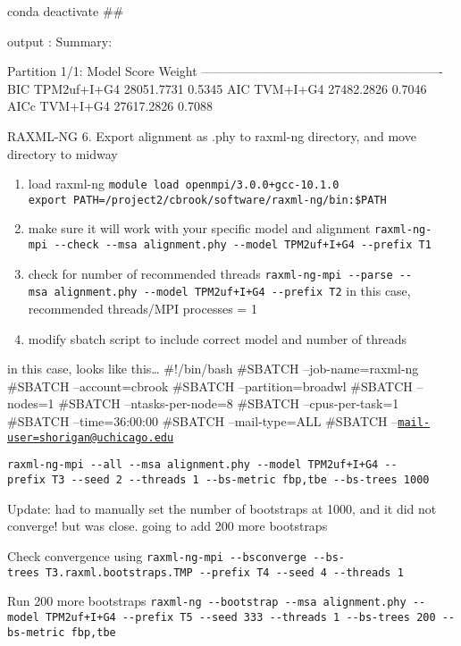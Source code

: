 \documentclass[
]{article}
\begin{document}
conda deactivate \#\#

output : Summary:

Partition 1/1: Model Score Weight
---------------------------------------------------------- BIC
TPM2uf+I+G4 28051.7731 0.5345 AIC TVM+I+G4 27482.2826 0.7046 AICc
TVM+I+G4 27617.2826 0.7088

RAXML-NG 6. Export alignment as .phy to raxml-ng directory, and move
directory to midway

\begin{enumerate}
\def\labelenumi{\arabic{enumi}.}
\setcounter{enumi}{6}
\item
  load raxml-ng \texttt{module\ load\ openmpi/3.0.0+gcc-10.1.0}
  \texttt{export\ PATH=/project2/cbrook/software/raxml-ng/bin:\$PATH}
\item
  make sure it will work with your specific model and alignment
  \texttt{raxml-ng-mpi\ -\/-check\ -\/-msa\ alignment.phy\ -\/-model\ TPM2uf+I+G4\ -\/-prefix\ T1}
\item
  check for number of recommended threads
  \texttt{raxml-ng-mpi\ -\/-parse\ -\/-msa\ alignment.phy\ -\/-model\ TPM2uf+I+G4\ -\/-prefix\ T2}
  in this case, recommended threads/MPI processes = 1
\item
  modify sbatch script to include correct model and number of threads
\end{enumerate}

in this case, looks like this\ldots{} \#!/bin/bash \#SBATCH
--job-name=raxml-ng \#SBATCH --account=cbrook \#SBATCH
--partition=broadwl \#SBATCH --nodes=1 \#SBATCH --ntasks-per-node=8
\#SBATCH --cpus-per-task=1 \#SBATCH --time=36:00:00 \#SBATCH
--mail-type=ALL \#SBATCH
--\href{mailto:mail-user=shorigan@uchicago.edu}{\nolinkurl{mail-user=shorigan@uchicago.edu}}

\texttt{raxml-ng-mpi\ -\/-all\ -\/-msa\ alignment.phy\ -\/-model\ TPM2uf+I+G4\ -\/-prefix\ T3\ -\/-seed\ 2\ -\/-threads\ 1\ -\/-bs-metric\ fbp,tbe\ -\/-bs-trees\ 1000}

Update: had to manually set the number of bootstraps at 1000, and it did
not converge! but was close. going to add 200 more bootstraps

Check convergence using
\texttt{raxml-ng-mpi\ -\/-bsconverge\ -\/-bs-trees\ T3.raxml.bootstraps.TMP\ -\/-prefix\ T4\ -\/-seed\ 4\ -\/-threads\ 1}

Run 200 more bootstraps
\texttt{raxml-ng\ -\/-bootstrap\ -\/-msa\ alignment.phy\ -\/-model\ TPM2uf+I+G4\ -\/-prefix\ T5\ -\/-seed\ 333\ -\/-threads\ 1\ -\/-bs-trees\ 200\ -\/-bs-metric\ fbp,tbe}
\end{document}
